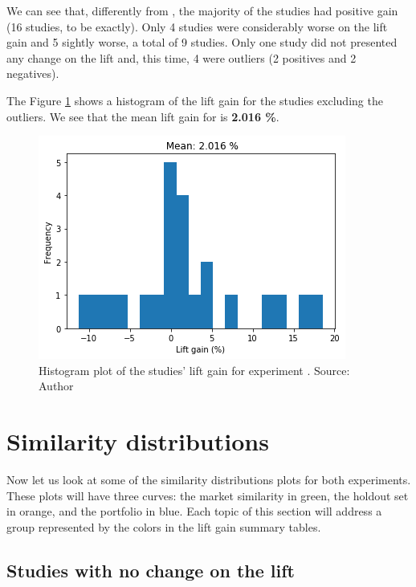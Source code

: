 We can see that, differently from \nameExperimentI{}, the majority of the studies had positive gain (16 studies, to be exactly). Only 4 studies were considerably worse on the lift gain and 5 sightly worse, a total of 9 studies. Only one study did not presented any change on the lift and, this time, 4 were outliers (2 positives and 2 negatives).

The Figure \ref{fig:lift-hist-plot-exp-ii} shows a histogram of the lift gain for the studies excluding the outliers. We see that the mean lift gain for \nameExperimentII{} is \textbf{2.016 \%}.

\begin{figure}[h]
   \centering
   \includegraphics[width=\linewidth]{fig/ch4-lift-hist-plot-exp-ii.png}
   \caption{Histogram plot of the studies' lift gain for experiment \nameExperimentII{}. Source: Author}
   \label{fig:lift-hist-plot-exp-ii}
\end{figure}

\section{Similarity distributions}
\label{ch:simi-distis}

Now let us look at some of the similarity distributions plots for both experiments. These plots will have three curves: the market similarity in green, the holdout set in orange, and the portfolio in blue. Each topic of this section will address a group represented by the colors in the lift gain summary tables. 

\subsection{Studies with no change on the lift}

